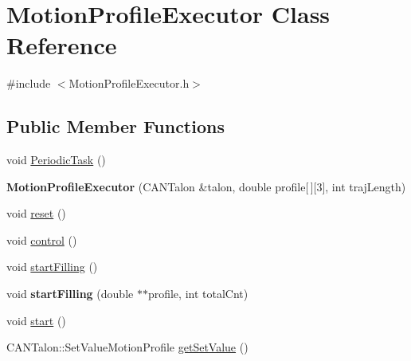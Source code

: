 \hypertarget{class_motion_profile_executor}{}\section{Motion\+Profile\+Executor Class Reference}
\label{class_motion_profile_executor}


{\ttfamily \#include $<$Motion\+Profile\+Executor.\+h$>$}

\subsection*{Public Member Functions}
\begin{DoxyCompactItemize}
\item 
void \hyperlink{class_motion_profile_executor_a6599521948ebfd609d9b4c53539f597f}{Periodic\+Task} ()
\item 
\mbox{\label{class_motion_profile_executor_aa552856d9f744a9a38add555eac3669b}} 
{\bfseries Motion\+Profile\+Executor} (C\+A\+N\+Talon \&talon, double profile\mbox{[}$\,$\mbox{]}\mbox{[}3\mbox{]}, int traj\+Length)
\item 
void \hyperlink{class_motion_profile_executor_a3e94905fe37d30840822bd819978b79d}{reset} ()
\item 
void \hyperlink{class_motion_profile_executor_a60a8d4ab5b168b31e75619b2a3683a78}{control} ()
\item 
void \hyperlink{class_motion_profile_executor_a16ef527ec6fea68ae7ac06785ddb3b7c}{start\+Filling} ()
\item 
\mbox{\label{class_motion_profile_executor_a1a77e57ff634e1189fe3fe2249bbff3b}} 
void {\bfseries start\+Filling} (double $\ast$$\ast$profile, int total\+Cnt)
\item 
void \hyperlink{class_motion_profile_executor_a49d7debb97c9c722ee8fc2f6d43d21ca}{start} ()
\item 
C\+A\+N\+Talon\+::\+Set\+Value\+Motion\+Profile \hyperlink{class_motion_profile_executor_aad1297807d386b66246ca4154e136485}{get\+Set\+Value} ()
\end{DoxyCompactItemize}
